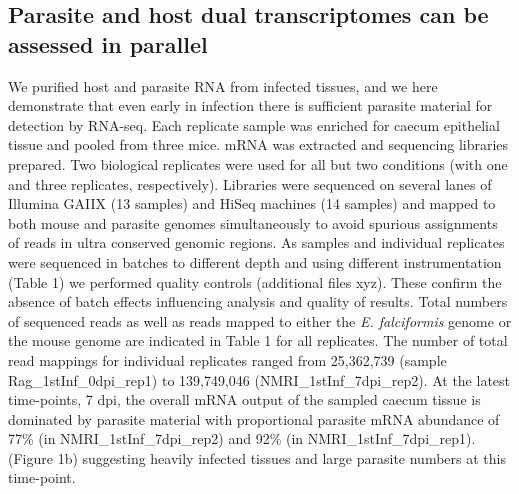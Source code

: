 \documentclass{bmcart}
\begin{document}
\subsection*{Parasite and host dual transcriptomes can be assessed in parallel}
We purified host and parasite RNA from infected tissues, and we here demonstrate that even early in infection there is sufficient parasite material for detection by RNA-seq. Each replicate sample was enriched for caecum epithelial tissue and pooled from three mice. mRNA was extracted and sequencing libraries prepared. Two biological replicates were used for all but two conditions (with one and three replicates, respectively). Libraries were sequenced on several lanes of Illumina GAIIX (13 samples) and HiSeq machines (14 samples) and mapped to both mouse and parasite genomes simultaneously to avoid spurious assignments of reads in ultra conserved genomic regions. As samples and individual replicates were sequenced in batches to different depth and using different instrumentation (Table 1) we performed quality controls (additional files xyz). These confirm the absence of batch effects influencing analysis and quality of results. Total numbers of sequenced reads as well as reads mapped to either the \textit{E. falciformis} genome or the mouse genome are indicated in Table 1 for all replicates. The number of total read mappings for individual replicates ranged from 25,362,739 (sample Rag\_1stInf\_0dpi\_rep1) to 139,749,046 (NMRI\_1stInf\_7dpi\_rep2). At the latest time-points, 7 dpi, the overall mRNA output of the sampled caecum tissue is dominated by parasite material with proportional parasite mRNA abundance of 77\% (in NMRI\_1stInf\_7dpi\_rep2) and 92\% (in NMRI\_1stInf\_7dpi\_rep1). (Figure 1b) suggesting heavily infected tissues and large parasite numbers at this time-point.  
\end{document}
